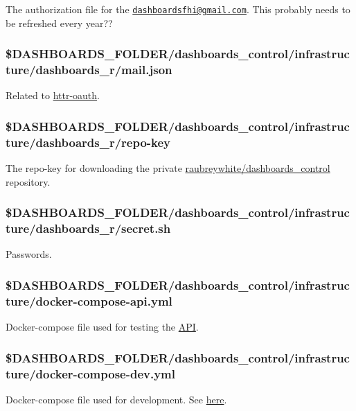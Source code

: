 \documentclass[12pt,]{article}
\begin{document}
The authorization file for the
\href{mailto:dashboardsfhi@gmail.com}{\nolinkurl{dashboardsfhi@gmail.com}}.
This probably needs to be refreshed every year??

\subsubsection{\$DASHBOARDS\_FOLDER/dashboards\_control/infrastructure/dashboards\_r/mail.json}\label{dashboards_folderdashboards_controlinfrastructuredashboards_rmail.json}

Related to \protect\hyperlink{httroauth}{httr-oauth}.

\subsubsection{\$DASHBOARDS\_FOLDER/dashboards\_control/infrastructure/dashboards\_r/repo-key}\label{dashboards_folderdashboards_controlinfrastructuredashboards_rrepo-key}

The repo-key for downloading the private
\href{https://github.com/raubreywhite/dashboards_control}{raubreywhite/dashboards\_control}
repository.

\subsubsection{\$DASHBOARDS\_FOLDER/dashboards\_control/infrastructure/dashboards\_r/secret.sh}\label{dashboards_folderdashboards_controlinfrastructuredashboards_rsecret.sh}

Passwords.

\subsubsection{\$DASHBOARDS\_FOLDER/dashboards\_control/infrastructure/docker-compose-api.yml}\label{dashboards_folderdashboards_controlinfrastructuredocker-compose-api.yml}

Docker-compose file used for testing the
\href{https://github.com/folkehelseinstituttet/dashboards_sykdomspuls/blob/master/inst/src/RunAPI.R}{API}.

\subsubsection{\$DASHBOARDS\_FOLDER/dashboards\_control/infrastructure/docker-compose-dev.yml}\label{dashboards_folderdashboards_controlinfrastructuredocker-compose-dev.yml}

Docker-compose file used for development. See
\protect\hyperlink{dockercompose}{here}.
\end{document}
